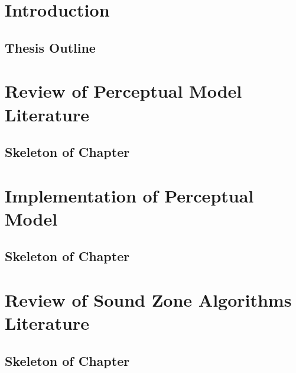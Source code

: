 \documentclass[11pt,twoside,openright,titlepage]{ce}
\begin{document}
\frontmatter
\makecover
\maketitle
\makesignature


\tableofcontents
{}
\listoffigures
\listoftables
\mainmatter

\chapter{Introduction}
\label{sec:introduction}
\section*{Thesis Outline}


\chapter{Review of Perceptual Model Literature}
\label{sec:literature_review_perceptual_models}
\begin{tcolorbox}
\section*{Skeleton of Chapter}

\end{tcolorbox}
\newpage


\chapter{Implementation of Perceptual Model}
\label{sec:perceptual_models}
\begin{tcolorbox}
\section*{Skeleton of Chapter}

\end{tcolorbox}
\newpage


\chapter{Review of Sound Zone Algorithms Literature}
\label{sec:literature_review_sound_zones}
\begin{tcolorbox}
\section*{Skeleton of Chapter}

\end{tcolorbox}
\newpage

\end{document}
